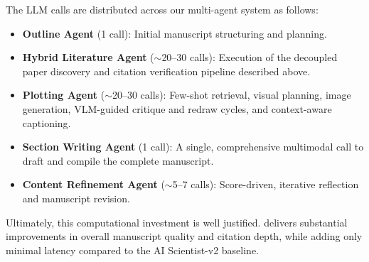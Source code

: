 The LLM calls are distributed across our multi-agent system as follows:
\begin{itemize}
    \item \textbf{Outline Agent} (1 call): Initial manuscript structuring and planning.
    \item \textbf{Hybrid Literature Agent} ($\sim$20--30 calls): Execution of the decoupled paper discovery and citation verification pipeline described above.
    \item \textbf{Plotting Agent} ($\sim$20--30 calls): Few-shot retrieval, visual planning, image generation, VLM-guided critique and redraw cycles, and context-aware captioning.
    \item \textbf{Section Writing Agent} (1 call): A single, comprehensive multimodal call to draft and compile the complete \mylatex{} manuscript.
    \item \textbf{Content Refinement Agent} ($\sim$5--7 calls): Score-driven, iterative reflection and manuscript revision.
\end{itemize}

Ultimately, this computational investment is well justified. \ourmethod{} delivers substantial improvements in overall manuscript quality and citation depth, while adding only minimal latency compared to the AI Scientist-v2 baseline.